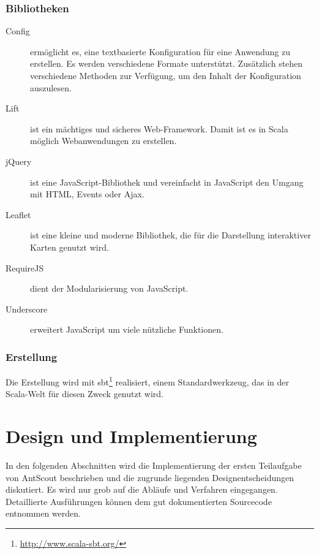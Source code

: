 \subsubsection{Bibliotheken}
\label{sec:bibliotheken}

\begin{description}
  \item[Config\footnotemark]  ermöglicht es, eine textbasierte Konfiguration für eine Anwendung zu erstellen.
    Es werden verschiedene Formate unterstützt.
    Zusätzlich stehen verschiedene Methoden zur Verfügung, um den Inhalt der Konfiguration auszulesen.
  \item[Lift\footnotemark]  ist ein mächtiges und sicheres Web-Framework.
    Damit ist es in Scala möglich Webanwendungen zu erstellen.
  \item[jQuery\footnotemark]  ist eine JavaScript-Bibliothek und vereinfacht in JavaScript den Umgang mit HTML, Events oder Ajax.
  \item[Leaflet\footnotemark]  ist eine kleine und moderne Bibliothek, die für die Darstellung interaktiver Karten genutzt wird.
  \item[RequireJS\footnotemark]  dient der Modularisierung von JavaScript.
  \item[Underscore\footnotemark]  erweitert JavaScript um viele nützliche Funktionen.
\end{description}

\subsubsection{Erstellung}
\label{sec:erstellung}

Die Erstellung wird mit \ac{sbt}\footnote{\url{http://www.scala-sbt.org/}} realisiert, einem Standardwerkzeug, das in der Scala-Welt für diesen Zweck genutzt wird.

\section{Design und Implementierung}
\label{sec:design-und-implementierung}

In den folgenden Abschnitten wird die Implementierung der ersten Teilaufgabe von AntScout beschrieben und die zugrunde liegenden Designentscheidungen diskutiert.
Es wird nur grob auf die Abläufe und Verfahren eingegangen.
Detaillierte Ausführungen können dem gut dokumentierten Sourcecode entnommen werden.

